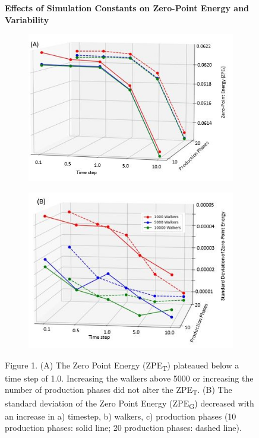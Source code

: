 \documentclass[journal=jacsat,manuscript=article]{achemso}
\newcommand*{\figuretitle}[1]{%
    {\centering%
    \textbf{#1}%
    \par\medskip}%
}
\begin{document}
\begin{figure}[H]
\centering
\figuretitle{Effects of Simulation Constants on Zero-Point Energy and Variability}
\begin{subfigure}{.5\textwidth}
  \centering
  \includegraphics[width=\linewidth]{figures/fig_1A.jpg}
\end{subfigure}%
\begin{subfigure}{.5\textwidth}
  \centering
  \includegraphics[width=\linewidth]{figures/fig_1B.jpg}
\end{subfigure}
\caption{Figure 1. (A) The Zero Point Energy (ZPE\textsubscript{T}) plateaued below a time step of 1.0. Increasing the walkers above 5000 or increasing the number of production phases did not alter the ZPE\textsubscript{T}.
(B) The standard deviation of the Zero Point Energy (ZPE\textsubscript{G}) decreased with an increase in a) timestep, b) walkers, c) production phases (10 production phases: solid line; 20 production phases: dashed line).}
\end{figure}
\end{document}
